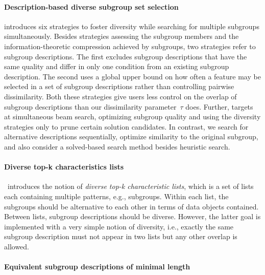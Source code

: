 \documentclass{article}
\theoremstyle{definition}
\begin{document}
\paragraph{Description-based diverse subgroup set selection}

\cite{leeuwen2012diverse} introduces six strategies to foster diversity while searching for multiple subgroups simultaneously.
Besides strategies assessing the subgroup members and the information-theoretic compression achieved by subgroups, two strategies refer to subgroup descriptions.
The first excludes subgroup descriptions that have the same quality and differ in only one condition from an existing subgroup description.
The second uses a global upper bound on how often a feature may be selected in a set of subgroup descriptions rather than controlling pairwise dissimilarity.
Both these strategies give users less control on the overlap of subgroup descriptions than our dissimilarity parameter~$\tau$ does.
Further, \cite{leeuwen2012diverse} targets at simultaneous beam search, optimizing subgroup quality and using the diversity strategies only to prune certain solution candidates.
In contrast, we search for alternative descriptions sequentially, optimize similarity to the original subgroup, and also consider a solved-based search method besides heuristic search.

\paragraph{Diverse top-k characteristics lists}

\cite{lopez2023discovering}~introduces the notion of \emph{diverse top-k characteristic lists}, which is a set of lists each containing multiple patterns, e.g., subgroups.
Within each list, the subgroups should be alternative to each other in terms of data objects contained.
Between lists, subgroup descriptions should be diverse.
However, the latter goal is implemented with a very simple notion of diversity, i.e., exactly the same subgroup description must not appear in two lists but any other overlap is allowed.

\paragraph{Equivalent subgroup descriptions of minimal length}
\end{document}
